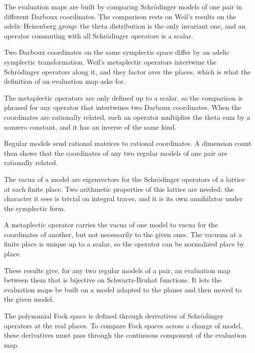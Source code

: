 The evaluation maps are built by comparing Schrödinger models of one pair in
different Darboux coordinates. The comparison rests on Weil's results on the
adelic Heisenberg group: the theta distribution is the only invariant one, and
an operator commuting with all Schrödinger operators is a scalar.

Two Darboux coordinates on the same symplectic space differ by an adelic
symplectic transformation. Weil's metaplectic operators intertwine the
Schrödinger operators along it, and they factor over the places, which is what
the definition of an evaluation map asks for.

The metaplectic operators are only defined up to a scalar, so the comparison
is phrased for any operator that intertwines two Darboux coordinates. When the
coordinates are rationally related, such an operator multiplies the theta sum
by a nonzero constant, and it has an inverse of the same kind.

Regular models send rational matrices to rational coordinates. A dimension
count then shows that the coordinates of any two regular models of one pair
are rationally related.

The vacua of a model are eigenvectors for the Schrödinger operators of a
lattice at each finite place. Two arithmetic properties of this lattice are
needed: the character it sees is trivial on integral traces, and it is its own
annihilator under the symplectic form.

A metaplectic operator carries the vacua of one model to vacua for the
coordinates of another, but not necessarily to the given ones. The vacuum at a
finite place is unique up to a scalar, so the operator can be normalized place
by place.

These results give, for any two regular models of a pair, an evaluation map
between them that is bijective on Schwartz-Bruhat functions. It lets the
evaluation maps be built on a model adapted to the planes and then moved to the
given model.

The polynomial Fock space is defined through derivatives of Schrödinger
operators at the real places. To compare Fock spaces across a change of model,
these derivatives must pass through the continuous component of the evaluation
map.


